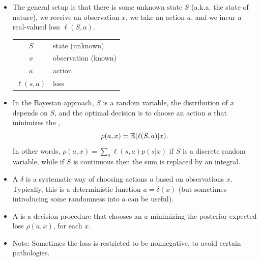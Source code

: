 \documentclass[12pt]{article}
\begin{document}
\begin{itemize}
\item The general setup is that there is some unknown state $S$ (a.k.a. the state of nature), we receive an observation $x$, we take an action $a$, and we incur a real-valued loss $\ell(S,a)$.
\begin{center}
\begin{tabular}{ c l }
$S$ & state (unknown) \\
$x$ & observation (known) \\
$a$ & action \\
$\ell(s,a)$ & loss
\end{tabular}
\end{center}
\item In the Bayesian approach, $S$ is a random variable, the distribution of $x$ depends on $S$, and the optimal decision is to choose an action $a$ that minimizes the ,
$$\rho(a,x) =\mathbb{E}(\ell(S,a)|x). $$
In other words, $\rho(a,x) =\sum_s \ell(s,a) p(s|x)$ if $S$ is a discrete random variable, while if $S$ is continuous then the sum is replaced by an integral.
\item A  $\delta$ is a systematic way of choosing actions $a$ based on observations $x$. Typically, this is a deterministic function $a=\delta(x)$ (but sometimes introducing some randomness into $a$ can be useful).
\item A  is a decision procedure that chooses an $a$ minimizing the posterior expected loss $\rho(a,x)$, for each $x$.
\item Note: Sometimes the loss is restricted to be nonnegative, to avoid certain pathologies. 
\end{itemize}
\end{document}
